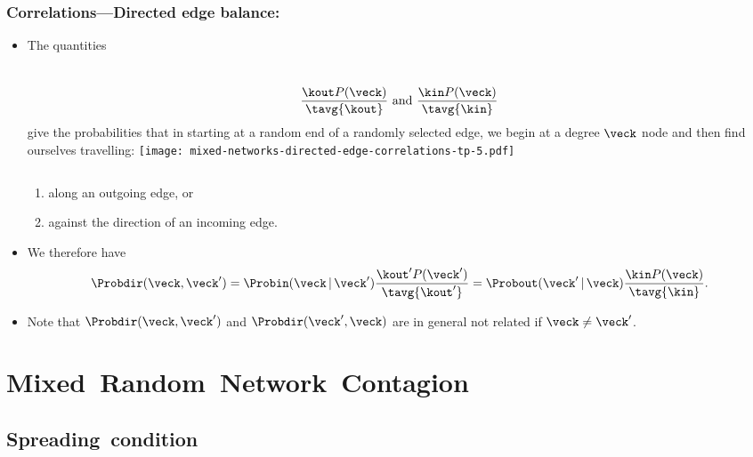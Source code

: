 \begin{frame}
  \frametitle{Correlations---Directed edge balance:}

    \begin{itemize}
    \item<1-> 
      The quantities
      \begin{columns}
        $$
        \frac{\kout P(\veck)}{\tavg{\kout}}
        \ \mbox{and} \
        \frac{\kin P(\veck)}{\tavg{\kin}}
        $$
      give the probabilities
      that in starting at a random end
      of a randomly selected edge,
      we begin at a degree $\veck$ node
      and then
      find ourselves travelling:
        \texttt{[image: mixed-networks-directed-edge-correlations-tp-5.pdf]}
      \end{columns}
      \begin{enumerate}
      \item 
        along an outgoing edge, or
      \item 
        against the direction of an incoming edge.
      \end{enumerate}
    \item<2->
      We therefore have
      $$
      \Probdir(\veck,\veck')
      =
      \Probin(\veck\, |\, \veck') 
      \frac{\kout' P(\veck')}{\tavg{\kout'}}
      =
      \Probout(\veck'\, |\, \veck) 
      \frac{\kin P(\veck)}{\tavg{\kin}}.
      $$
    \item<3->
      Note that 
      $
      \Probdir(\veck,\veck')
      $ 
      and
      $
      \Probdir(\veck',\veck)
      $
      are in general not related if $\veck \ne \veck'$.
    \end{itemize}

\end{frame}

\section{Mixed\ Random\ Network\ Contagion}

\subsection{Spreading\ condition}

